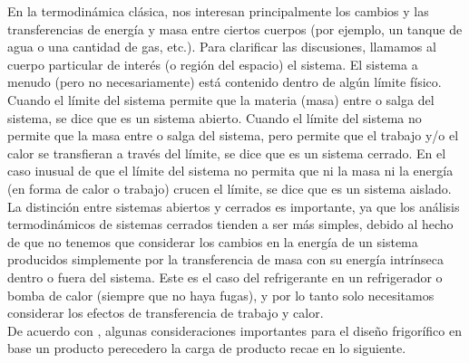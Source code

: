 En la termodinámica clásica, nos interesan principalmente los cambios y las transferencias de energía y masa entre ciertos cuerpos (por ejemplo, un tanque de agua o una cantidad de gas, etc.). Para clarificar las discusiones, llamamos al cuerpo particular de interés (o región del espacio) el sistema. El sistema a menudo (pero no necesariamente) está contenido dentro de algún límite físico. Cuando el límite del sistema permite que la materia (masa) entre o salga del sistema, se dice que es un sistema abierto. Cuando el límite del sistema no permite que la masa entre o salga del sistema, pero permite que el trabajo y/o el calor se transfieran a través del límite, se dice que es un sistema cerrado. En el caso inusual de que el límite del sistema no permita que ni la masa ni la energía (en forma de calor o trabajo) crucen el límite, se dice que es un sistema aislado.\\
La distinción entre sistemas abiertos y cerrados es importante, ya que los análisis termodinámicos de sistemas cerrados tienden a ser más simples, debido al hecho de que no tenemos que considerar los cambios en la energía de un sistema producidos simplemente por la transferencia de masa con su energía intrínseca dentro o fuera del sistema. Este es el caso del refrigerante en un refrigerador o bomba de calor (siempre que no haya fugas), y por lo tanto solo necesitamos considerar los efectos de transferencia de trabajo y calor. \cite{james-2013}\\
De acuerdo con \citeauthor{bohn}, \citeyear{bohn} algunas consideraciones importantes para el diseño frigorífico en base un producto perecedero la carga de producto recae en lo siguiente. 
